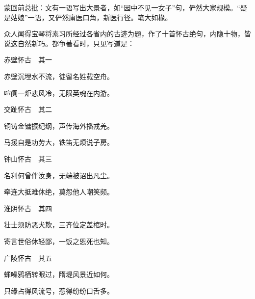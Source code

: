 \begin{parag}
    \begin{note}蒙回前总批：文有一语写出大景者，如“园中不见一女子”句，俨然大家规模。“疑是姑娘”一语，又俨然庸医口角，新医行径。笔大如椽。\end{note}
\end{parag}


\begin{parag}
    众人闻得宝琴将素习所经过各省内的古迹为题，作了十首怀古绝句，内隐十物，皆说这自然新巧。都争著看时，只见写道是：
\end{parag}


\begin{poem}
    \begin{pl}赤壁怀古　其一
    \end{pl}
    \begin{pl}赤壁沉埋水不流，徒留名姓载空舟。
    \end{pl}
    \begin{pl}喧阗一炬悲风冷，无限英魂在内游。
    \end{pl}
    \emptypl

    \begin{pl}交趾怀古　其二
    \end{pl}
    \begin{pl}铜铸金镛振纪纲，声传海外播戎羌。
    \end{pl}
    \begin{pl}马援自是功劳大，铁笛无烦说子房。
    \end{pl}
    \emptypl

    \begin{pl}钟山怀古　其三
    \end{pl}
    \begin{pl}名利何曾伴汝身，无端被诏出凡尘。
    \end{pl}
    \begin{pl}牵连大抵难休绝，莫怨他人嘲笑频。
    \end{pl}
    \emptypl
    \begin{pl}淮阴怀古　其四
    \end{pl}
    \begin{pl}壮士须防恶犬欺，三齐位定盖棺时。
    \end{pl}
    \begin{pl}寄言世俗休轻鄙，一饭之恩死也知。
    \end{pl}
    \emptypl

    \begin{pl}广陵怀古　其五
    \end{pl}
    \begin{pl}蝉噪鸦栖转眼过，隋堤风景近如何。
    \end{pl}
    \begin{pl}只缘占得风流号，惹得纷纷口舌多。
    \end{pl}
    \emptypl


\end{poem}
